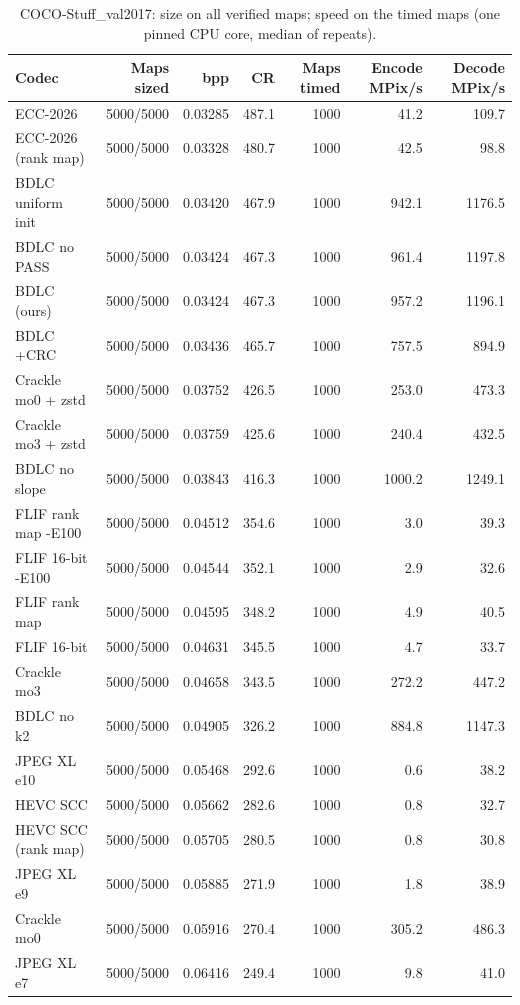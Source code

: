 \begin{table}[t]
\centering
\caption{COCO-Stuff\_val2017: size on all verified maps; speed on the timed maps (one pinned CPU core, median of repeats).}
\begin{tabular}{lrrrrrr}
\hline
Codec & Maps sized & bpp & CR & Maps timed & Encode MPix/s & Decode MPix/s \\
\hline
ECC-2026 & 5000/5000 & 0.03285 & 487.1 & 1000 & 41.2 & 109.7 \\
ECC-2026 (rank map) & 5000/5000 & 0.03328 & 480.7 & 1000 & 42.5 & 98.8 \\
BDLC uniform init & 5000/5000 & 0.03420 & 467.9 & 1000 & 942.1 & 1176.5 \\
BDLC no PASS & 5000/5000 & 0.03424 & 467.3 & 1000 & 961.4 & 1197.8 \\
BDLC (ours) & 5000/5000 & 0.03424 & 467.3 & 1000 & 957.2 & 1196.1 \\
BDLC +CRC & 5000/5000 & 0.03436 & 465.7 & 1000 & 757.5 & 894.9 \\
Crackle mo0 + zstd & 5000/5000 & 0.03752 & 426.5 & 1000 & 253.0 & 473.3 \\
Crackle mo3 + zstd & 5000/5000 & 0.03759 & 425.6 & 1000 & 240.4 & 432.5 \\
BDLC no slope & 5000/5000 & 0.03843 & 416.3 & 1000 & 1000.2 & 1249.1 \\
FLIF rank map -E100 & 5000/5000 & 0.04512 & 354.6 & 1000 & 3.0 & 39.3 \\
FLIF 16-bit -E100 & 5000/5000 & 0.04544 & 352.1 & 1000 & 2.9 & 32.6 \\
FLIF rank map & 5000/5000 & 0.04595 & 348.2 & 1000 & 4.9 & 40.5 \\
FLIF 16-bit & 5000/5000 & 0.04631 & 345.5 & 1000 & 4.7 & 33.7 \\
Crackle mo3 & 5000/5000 & 0.04658 & 343.5 & 1000 & 272.2 & 447.2 \\
BDLC no k2 & 5000/5000 & 0.04905 & 326.2 & 1000 & 884.8 & 1147.3 \\
JPEG XL e10 & 5000/5000 & 0.05468 & 292.6 & 1000 & 0.6 & 38.2 \\
HEVC SCC & 5000/5000 & 0.05662 & 282.6 & 1000 & 0.8 & 32.7 \\
HEVC SCC (rank map) & 5000/5000 & 0.05705 & 280.5 & 1000 & 0.8 & 30.8 \\
JPEG XL e9 & 5000/5000 & 0.05885 & 271.9 & 1000 & 1.8 & 38.9 \\
Crackle mo0 & 5000/5000 & 0.05916 & 270.4 & 1000 & 305.2 & 486.3 \\
JPEG XL e7 & 5000/5000 & 0.06416 & 249.4 & 1000 & 9.8 & 41.0 \\

\end{tabular}
\end{table}
